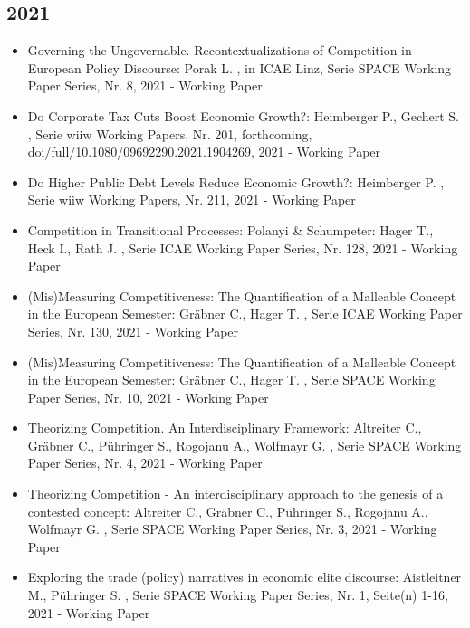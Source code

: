  \subsection{2021} 
 \begin{itemize} 
	 \item Governing the Ungovernable. Recontextualizations of Competition in European Policy Discourse: Porak L. , in ICAE Linz, Serie SPACE Working Paper Series, Nr. 8, 2021 - Working Paper
	 \item Do Corporate Tax Cuts Boost Economic Growth?: Heimberger P., Gechert S. , Serie wiiw Working Papers, Nr. 201, forthcoming, doi/full/10.1080/09692290.2021.1904269, 2021 - Working Paper
	 \item Do Higher Public Debt Levels Reduce Economic Growth?: Heimberger P. , Serie wiiw Working Papers, Nr. 211, 2021 - Working Paper
	 \item Competition in Transitional Processes: Polanyi & Schumpeter: Hager T., Heck I., Rath J. , Serie ICAE Working Paper Series, Nr. 128, 2021 - Working Paper
	 \item (Mis)Measuring Competitiveness: The Quantification of a Malleable Concept in the European Semester: Gräbner C., Hager T. , Serie ICAE Working Paper Series, Nr. 130, 2021 - Working Paper
	 \item (Mis)Measuring Competitiveness: The Quantification of a Malleable Concept in the European Semester: Gräbner C., Hager T. , Serie SPACE Working Paper Series, Nr. 10, 2021 - Working Paper
	 \item Theorizing Competition. An Interdisciplinary Framework: Altreiter C., Gräbner C., Pühringer S., Rogojanu A., Wolfmayr G. , Serie SPACE Working Paper Series, Nr. 4, 2021 - Working Paper
	 \item Theorizing Competition - An interdisciplinary approach to the genesis of a contested concept: Altreiter C., Gräbner C., Pühringer S., Rogojanu A., Wolfmayr G. , Serie SPACE Working Paper Series, Nr. 3, 2021 - Working Paper
	 \item Exploring the trade (policy) narratives in economic elite discourse: Aistleitner M., Pühringer S. , Serie SPACE Working Paper Series, Nr. 1, Seite(n) 1-16, 2021 - Working Paper
\end{itemize} 
